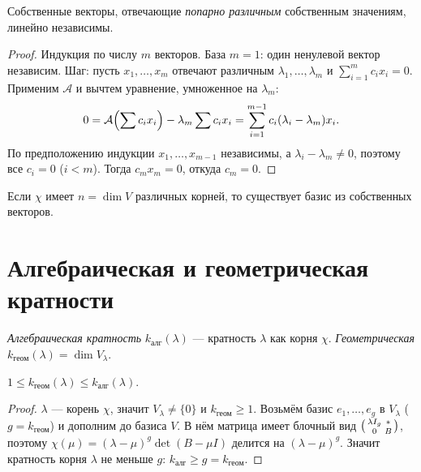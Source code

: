 \begin{theorem}
Собственные векторы, отвечающие \emph{попарно различным} собственным значениям, линейно независимы.
\end{theorem}

\begin{proof}
Индукция по числу $m$ векторов. База $m=1$: один ненулевой вектор независим. Шаг: пусть
$x_1,\dots,x_m$ отвечают различным $\lambda_1,\dots,\lambda_m$ и
$\sum_{i=1}^m c_i x_i=0$. Применим $\mathcal A$ и вычтем уравнение, умноженное на $\lambda_m$:
\[
  0=\mathcal A\Bigl(\sum c_i x_i\Bigr)-\lambda_m\sum c_i x_i=\sum_{i=1}^{m-1}c_i(\lambda_i-\lambda_m)x_i .
\]
По предположению индукции $x_1,\dots,x_{m-1}$ независимы, а $\lambda_i-\lambda_m\ne0$, поэтому все
$c_i=0$ ($i<m$). Тогда $c_m x_m=0$, откуда $c_m=0$.
\end{proof}

\begin{corollary}
Если $\chi$ имеет $n=\dim V$ различных корней, то существует базис из собственных векторов.
\end{corollary}

\section{Алгебраическая и геометрическая кратности}

\begin{definition}
\emph{Алгебраическая кратность} $k_{\text{алг}}(\lambda)$ — кратность $\lambda$ как корня $\chi$.
\emph{Геометрическая} $k_{\text{геом}}(\lambda)=\dim V_\lambda$.
\end{definition}

\begin{theorem}
$1\le k_{\text{геом}}(\lambda)\le k_{\text{алг}}(\lambda)$.
\end{theorem}

\begin{proof}
$\lambda$ — корень $\chi$, значит $V_\lambda\ne\{0\}$ и $k_{\text{геом}}\ge1$. Возьмём базис
$e_1,\dots,e_g$ в $V_\lambda$ ($g=k_{\text{геом}}$) и дополним до базиса $V$. В нём матрица имеет
блочный вид $\begin{psmallmatrix}\lambda I_g & *\\ 0 & B\end{psmallmatrix}$, поэтому
$\chi(\mu)=(\lambda-\mu)^g\det(B-\mu I)$ делится на $(\lambda-\mu)^g$. Значит кратность корня
$\lambda$ не меньше $g$: $k_{\text{алг}}\ge g=k_{\text{геом}}$.
\end{proof}

